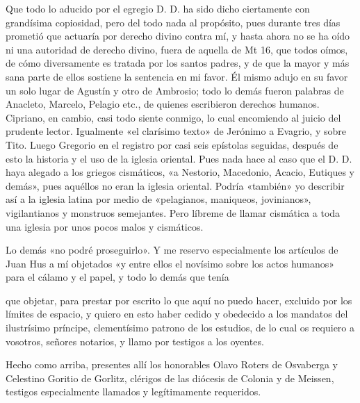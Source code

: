 Que todo lo aducido por el egregio D. D. ha sido dicho ciertamente con grandísima copiosidad, pero del todo nada al propósito, pues durante tres días prometió que actuaría por derecho divino contra mí, y hasta ahora no se ha oído ni una autoridad de derecho divino, fuera de aquella de Mt 16, que todos oímos, de cómo diversamente es tratada por los santos padres, y de que la mayor y más sana parte de ellos sostiene la sentencia en mi favor. Él mismo adujo en su favor un solo lugar de Agustín y otro de Ambrosio; todo lo demás fueron palabras de Anacleto, Marcelo, Pelagio etc., de quienes escribieron derechos humanos. Cipriano, en cambio, casi todo siente conmigo, lo cual encomiendo al juicio del prudente lector. Igualmente «el clarísimo texto» de Jerónimo a Evagrio, y sobre Tito. Luego Gregorio en el registro por casi seis epístolas seguidas, después de esto la historia y el uso de la iglesia oriental. Pues nada hace al caso que el D. D. haya alegado a los griegos cismáticos, «a Nestorio, Macedonio, Acacio, Eutiques y demás», pues aquéllos no eran la iglesia oriental. Podría «también» yo describir así a la iglesia latina por medio de «pelagianos, maniqueos, jovinianos», vigilantianos y monstruos semejantes. Pero líbreme de llamar cismática a toda una iglesia por unos pocos malos y cismáticos.

Lo demás «no podré proseguirlo». Y me reservo especialmente los artículos de Juan Hus a mí objetados «y entre ellos el novísimo sobre los actos humanos» para el cálamo y el papel, y todo lo demás que tenía

que objetar, para prestar por escrito lo que aquí no puedo hacer, excluido por los límites de espacio, y quiero en esto haber cedido y obedecido a los mandatos del ilustrísimo príncipe, clementísimo patrono de los estudios, de lo cual os requiero a vosotros, señores notarios, y llamo por testigos a los oyentes.

Hecho como arriba, presentes allí los honorables Olavo Roters de Osvaberga y Celestino Goritio de Gorlitz, clérigos de las diócesis de Colonia y de Meissen, testigos especialmente llamados y legítimamente requeridos.

